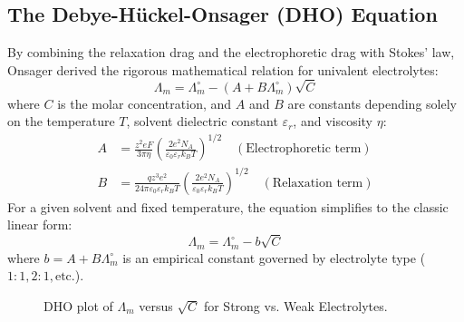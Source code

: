 \subsection{The Debye-Hückel-Onsager (DHO) Equation}
By combining the relaxation drag and the electrophoretic drag with Stokes' law, Onsager derived the rigorous mathematical relation for univalent electrolytes:
\begin{equation}
    \boxed{\Lambda_m = \Lambda_m^\circ - \left( A + B \Lambda_m^\circ \right) \sqrt{C}}
\end{equation}
where $C$ is the molar concentration, and $A$ and $B$ are constants depending solely on the temperature $T$, solvent dielectric constant $\varepsilon_r$, and viscosity $\eta$:
\begin{align}
    A &= \frac{z^2 e F}{3 \pi \eta} \left( \frac{2 e^2 N_A}{\varepsilon_0 \varepsilon_r k_B T} \right)^{1/2} \quad (\text{Electrophoretic term}) \\
    B &= \frac{q z^3 e^2}{24 \pi \varepsilon_0 \varepsilon_r k_B T} \left( \frac{2 e^2 N_A}{\varepsilon_0 \varepsilon_r k_B T} \right)^{1/2} \quad (\text{Relaxation term})
\end{align}
For a given solvent and fixed temperature, the equation simplifies to the classic linear form:
\begin{equation}
    \boxed{\Lambda_m = \Lambda_m^\circ - b \sqrt{C}}
\end{equation}
where $b = A + B \Lambda_m^\circ$ is an empirical constant governed by electrolyte type ($1:1, 2:1, \text{etc.}$).

\begin{figure}[htbp]
\centering
{}
\caption{DHO plot of $\Lambda_m$ versus $\sqrt{C}$ for Strong vs. Weak Electrolytes.}
\label{fig:dho_plot}
\end{figure}

